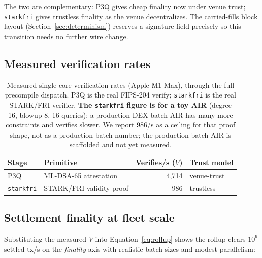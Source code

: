 The two are complementary: P3Q gives cheap finality now under venue trust;
\texttt{starkfri} gives trustless finality as the venue decentralizes. The carried-fills
block layout (Section~\ref{sec:determinism}) reserves a signature field precisely so this
transition needs no further wire change.

\subsection{Measured verification rates}

\begin{table}[H]
\centering
\renewcommand{\arraystretch}{1.25}
\begin{tabular}{l l r l}
\toprule
\textbf{Stage} & \textbf{Primitive} & \textbf{Verifies/s ($V$)} & \textbf{Trust model} \\
\midrule
P3Q       & ML-DSA-65 attestation & 4{,}714 & venue-trust \\
\texttt{starkfri} & STARK/FRI validity proof & 986 & trustless \\
\bottomrule
\end{tabular}
\caption{Measured single-core verification rates (Apple M1 Max), through the full precompile
dispatch. P3Q is the real FIPS-204 verify; \texttt{starkfri} is the real STARK/FRI verifier.
\textbf{The \texttt{starkfri} figure is for a toy AIR} (degree 16, blowup 8, 16 queries); a
production DEX-batch AIR has many more constraints and verifies slower. We report 986/s as a
ceiling for that proof shape, not as a production-batch number; the production-batch AIR is
scaffolded and not yet measured.}
\label{tab:verify}
\end{table}

\subsection{Settlement finality at fleet scale}

Substituting the measured $V$ into Equation~\eqref{eq:rollup} shows the rollup clears
$10^{9}$ settled-tx/s on the \emph{finality} axis with realistic batch sizes and modest
parallelism:

